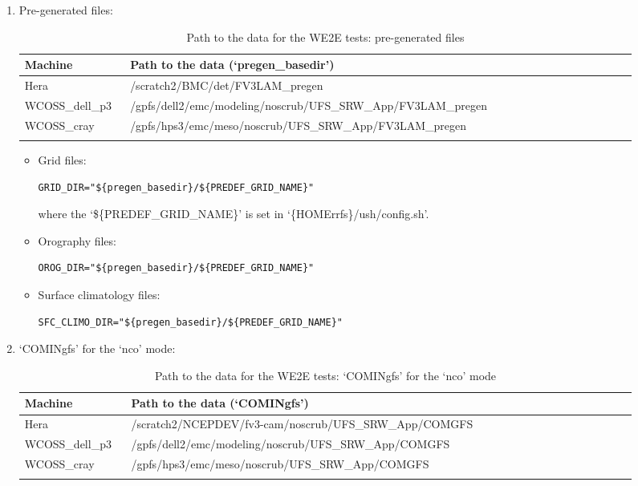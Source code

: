 \documentclass[11pt,fleqn]{report}              %
\begin{document}
\begin{enumerate}
\item Pre-generated files:

{
\fontsize{10}{12}\selectfont
\begin{longtable}{p{0.16\linewidth} | p{0.77\linewidth} }
\hline
\hline
Machine & Path to the data (`pregen\_basedir') \\
\hline
 Hera & /scratch2/BMC/det/FV3LAM\_pregen \\
 WCOSS\_dell\_p3 & /gpfs/dell2/emc/modeling/noscrub/UFS\_SRW\_App/FV3LAM\_pregen \\
 WCOSS\_cray & /gpfs/hps3/emc/meso/noscrub/UFS\_SRW\_App/FV3LAM\_pregen \\
\hline
\caption{Path to the data for the WE2E tests: pre-generated files}
\label{table:path_data_we2e_pregen_files}
\end{longtable}
}

\begin{itemize}
\item Grid files: 
\lstset{language=bash}   
\begin{lstlisting}[frame=trBL]
GRID_DIR="${pregen_basedir}/${PREDEF_GRID_NAME}"
\end{lstlisting}
where the `\$\{PREDEF\_GRID\_NAME\}' is set in `\{HOMErrfs\}/ush/config.sh'.

\item Orography files: 
\lstset{language=bash}   
\begin{lstlisting}[frame=trBL]
OROG_DIR="${pregen_basedir}/${PREDEF_GRID_NAME}"
\end{lstlisting}

\item Surface climatology files: 
\lstset{language=bash}   
\begin{lstlisting}[frame=trBL]
SFC_CLIMO_DIR="${pregen_basedir}/${PREDEF_GRID_NAME}"
\end{lstlisting}

\end{itemize}


\item `COMINgfs' for the `nco' mode:
{
\fontsize{10}{12}\selectfont
\begin{longtable}{ p{0.16\linewidth} | p{0.76\linewidth} }
\hline
\hline
 Machine & Path to the data (`COMINgfs') \\
\hline
 Hera & /scratch2/NCEPDEV/fv3-cam/noscrub/UFS\_SRW\_App/COMGFS \\
 WCOSS\_dell\_p3 & /gpfs/dell2/emc/modeling/noscrub/UFS\_SRW\_App/COMGFS \\
 WCOSS\_cray & /gpfs/hps3/emc/meso/noscrub/UFS\_SRW\_App/COMGFS \\
\hline
\caption{Path to the data for the WE2E tests: `COMINgfs' for the `nco' mode}
\label{table:path_data_we2e_comingfs}
\end{longtable}
}


\end{enumerate}
\end{document}
